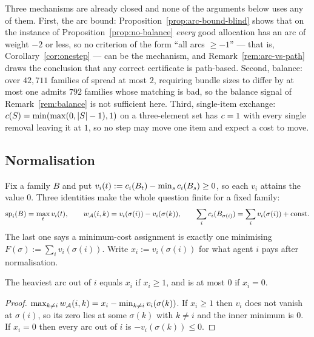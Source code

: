 \begin{remark}
\label{rem:f5-closures}
Three mechanisms are already closed and none of the arguments below uses any of
them. First, the arc bound: Proposition~\ref{prop:arc-bound-blind} shows that on
the instance of Proposition~\ref{prop:no-balance} \emph{every} good allocation
has an arc of weight $-2$ or less, so no criterion of the form
``all arcs $\ge -1$'' --- that is, Corollary~\ref{cor:onestep} --- can be the
mechanism, and Remark~\ref{rem:arc-vs-path} draws the conclusion that any correct
certificate is path-based. Second, balance: over $42{,}711$ families of spread at
most $2$, requiring bundle sizes to differ by at most one admits $792$ families
whose matching is bad, so the balance signal of Remark~\ref{rem:balance} is not
sufficient here. Third, single-item exchange: $c(S) = \min(\max(0,\left\lvert S\right\rvert-1),1)$
on a three-element set has $c = 1$ with every single removal leaving it at
$1$, so no step may move one item and expect a cost to move.
\end{remark}

\subsection{Normalisation}
\label{sec:f5-normal}

Fix a family $B$ and put
$v_i(t) := c_i(B_t) - \min_s c_i(B_s) \ge 0$, so each $v_i$ attains the
value $0$. Three identities make the whole question finite for a fixed family:
\[
  \mathrm{sp}_i(B) = \max_t v_i(t), \qquad
  w_{\mathcal{A}}(i,k) = v_i(\sigma(i)) - v_i(\sigma(k)), \qquad
  \sum_i c_i(B_{\sigma(i)}) = \sum_i v_i(\sigma(i)) + \text{const}.
\]
The last one says a minimum-cost assignment is exactly one minimising
$F(\sigma) := \sum_i v_i(\sigma(i))$. Write $x_i := v_i(\sigma(i))$ for what
agent $i$ pays after normalisation.

\begin{observation}
\label{obs:f5-arcs}
The heaviest arc out of $i$ equals $x_i$ if $x_i \ge 1$, and is at most $0$ if
$x_i = 0$.
\end{observation}

\begin{proof}
$\max_{k \ne i}w_{\mathcal{A}}(i,k) = x_i - \min_{k \ne i} v_i(\sigma(k))$. If
$x_i \ge 1$ then $v_i$ does not vanish at $\sigma(i)$, so its zero lies at some
$\sigma(k)$ with $k \ne i$ and the inner minimum is $0$. If $x_i = 0$ then every
arc out of $i$ is $-v_i(\sigma(k)) \le 0$.
\end{proof}

